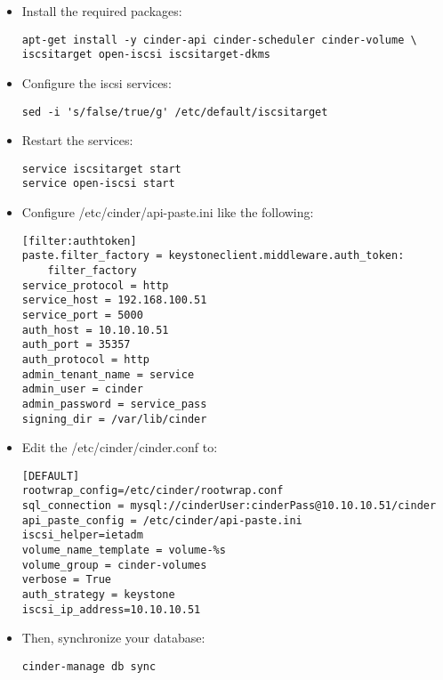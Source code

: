 \begin{itemize}
\item Install the required packages:

\begin{verbatim}
apt-get install -y cinder-api cinder-scheduler cinder-volume \
iscsitarget open-iscsi iscsitarget-dkms
\end{verbatim}


\item Configure the iscsi services:

\begin{verbatim}
sed -i 's/false/true/g' /etc/default/iscsitarget
\end{verbatim}


\item Restart the services:

\begin{verbatim}
service iscsitarget start
service open-iscsi start
\end{verbatim}


\item Configure \slash etc\slash cinder\slash api-paste.ini like the following:

\begin{verbatim}
[filter:authtoken]
paste.filter_factory = keystoneclient.middleware.auth_token:
    filter_factory
service_protocol = http
service_host = 192.168.100.51
service_port = 5000
auth_host = 10.10.10.51
auth_port = 35357
auth_protocol = http
admin_tenant_name = service
admin_user = cinder
admin_password = service_pass
signing_dir = /var/lib/cinder
\end{verbatim}


\item Edit the \slash etc\slash cinder\slash cinder.conf to:

\begin{verbatim}
[DEFAULT]
rootwrap_config=/etc/cinder/rootwrap.conf
sql_connection = mysql://cinderUser:cinderPass@10.10.10.51/cinder
api_paste_config = /etc/cinder/api-paste.ini
iscsi_helper=ietadm
volume_name_template = volume-%s
volume_group = cinder-volumes
verbose = True
auth_strategy = keystone
iscsi_ip_address=10.10.10.51
\end{verbatim}


\item Then, synchronize your database:

\begin{verbatim}
cinder-manage db sync
\end{verbatim}



\end{itemize}
